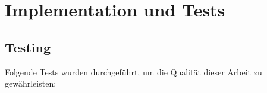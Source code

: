 \section{Implementation und Tests}

%




\subsection{Testing}
Folgende Tests wurden durchgeführt, um die Qualität dieser Arbeit zu gewährleisten:

